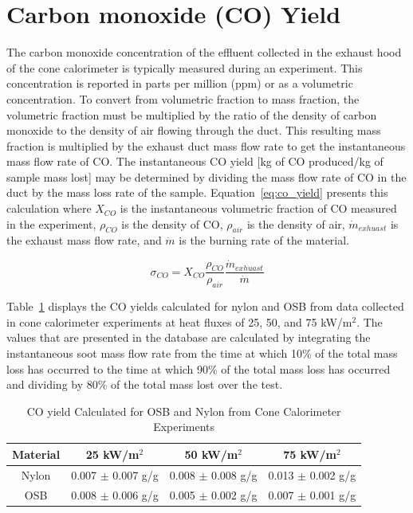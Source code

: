 \documentclass[12pt,oneside]{book}
\begin{document}
\section{Carbon monoxide (CO) Yield}

The carbon monoxide concentration of the effluent collected in the exhaust hood of the cone calorimeter is typically measured during an experiment. This concentration is reported in parts per million (ppm) or as a volumetric concentration. To convert from volumetric fraction to mass fraction, the volumetric fraction must be multiplied by the ratio of the density of carbon monoxide to the density of air flowing through the duct. This resulting mass fraction is multiplied by the exhaust duct mass flow rate to get the instantaneous mass flow rate of CO. The instantaneous CO yield [kg of CO produced/kg of sample mass lost] may be determined by dividing the mass flow rate of CO in the duct by the mass loss rate of the sample. Equation~\ref{eq:co_yield} presents this calculation where $X_{CO}$ is the instantaneous volumetric fraction of CO measured in the experiment, $\rho_{CO}$ is the density of CO, $\rho_{air}$ is the density of air, $\dot{m}_{exhuast}$ is the exhaust mass flow rate, and $\dot{m}$ is the burning rate of the material.

\begin{equation}
\sigma_{CO} = X_{CO}\frac{\rho_{CO}}{\rho_{air}}\frac{\dot{m}_{exhuast}}{\dot{m}}  \label{eq:co_yield}
\end{equation}

Table~\ref{tab:co_yield} displays the CO yields calculated for nylon and OSB from data collected in cone calorimeter experiments at heat fluxes of 25, 50, and 75 kW/m$^2$. The values that are presented in the database are calculated by integrating the instantaneous soot mass flow rate from the time at which 10\% of the total mass loss has occurred to the time at which 90\% of the total mass loss has occurred and dividing by 80\% of the total mass lost over the test.

\begin{table}[!ht]{}
\centering
\caption[CO yield Calculated for OSB and Nylon from Cone Calorimeter Experiments]{CO yield Calculated for OSB and Nylon from Cone Calorimeter Experiments}
{\begin{tabular}{cccc}
\toprule
Material 			& 25 kW/m$^2$				& 50 kW/m$^2$ 				& 75 kW/m$^2$  \\
\midrule
Nylon 				& 0.007 $\pm$ 0.007 g/g		& 0.008 $\pm$ 0.008 g/g		& 0.013 $\pm$ 0.002 g/g   \\ 
OSB 				& 0.008 $\pm$ 0.006 g/g 	& 0.005 $\pm$ 0.002 g/g		& 0.007 $\pm$ 0.001 g/g    \\
\bottomrule
\end{tabular}}
\label{tab:co_yield}
\end{table}
\end{document}
